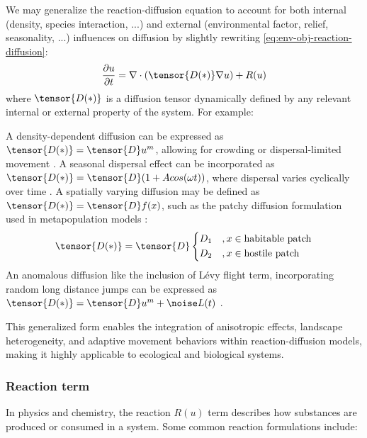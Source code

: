 We may generalize the reaction-diffusion equation to account for both internal (density, species interaction, ...) and external (environmental factor, relief, seasonality, ...) influences on diffusion by slightly rewriting \cref{eq:env-obj-reaction-diffusion}:
\begin{align}
    \frac{\partial u}{\partial t} = \nabla \cdot (\tensor{D(*)} \nabla u) + R(u)
\end{align}
where $\tensor{D(*)}$  is a diffusion tensor dynamically defined by any relevant internal or external property of the system. For example:
\begin{Itemize}
    \Item{} A density-dependent diffusion can be expressed as $\tensor{D(*)} = \tensor{D} u^m$, allowing for crowding or dispersal-limited movement \cite{Zhu2023}.
    \Item{} A seasonal dispersal effect can be incorporated as $\tensor{D(*)} = \tensor{D} (1 + A cos(\omega t) )$, where dispersal varies cyclically over time \cite{Katriel2021}.
    \Item{} A spatially varying diffusion may be defined as $\tensor{D(*)} = \tensor{D} f(x)$, such as the patchy diffusion formulation used in metapopulation models \cite{Czaran1998}:
    \begin{align}
        \tensor{D(*)} = \tensor{D} \begin{dcases}
            D_1&, x \in \text{habitable patch} \\
            D_2&, x \in \text{hostile patch}
        \end{dcases}
    \end{align}
    \Item{} An anomalous diffusion like the inclusion of Lévy flight term, incorporating random long distance jumps can be expressed as $\tensor{D(*)} = \tensor{D} u^m + \noise L(t)$ \cite{Humphries2014,Chechkin2008}.
\end{Itemize}

This generalized form enables the integration of anisotropic effects, landscape heterogeneity, and adaptive movement behaviors within reaction-diffusion models, making it highly applicable to ecological and biological systems.

\subsubsection{Reaction term}
In physics and chemistry, the reaction $R(u)$ term describes how substances are produced or consumed in a system. Some common reaction formulations include:

